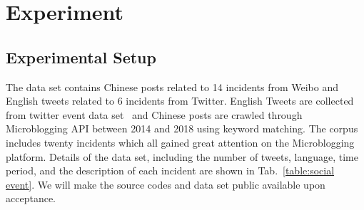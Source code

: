 \documentclass[runningheads]{llncs}
\begin{document}
\section{Experiment}\label{sec:Experiment}
\subsection{Experimental Setup}
The data set contains Chinese posts related to 14 incidents from Weibo and English tweets related to 6 incidents from Twitter. English Tweets are collected from twitter event data set~\cite{ZubiagaTwitterDatasets} and Chinese posts are crawled through Microblogging API between 2014 and 2018 using keyword matching. The corpus includes twenty incidents which all gained great attention on the Microblogging platform. Details of the data set, including the number of tweets, language, time period, and the description of each incident are shown in Tab.~\ref{table:social event}. We will make the source codes and data set public available upon acceptance.
\end{document}
